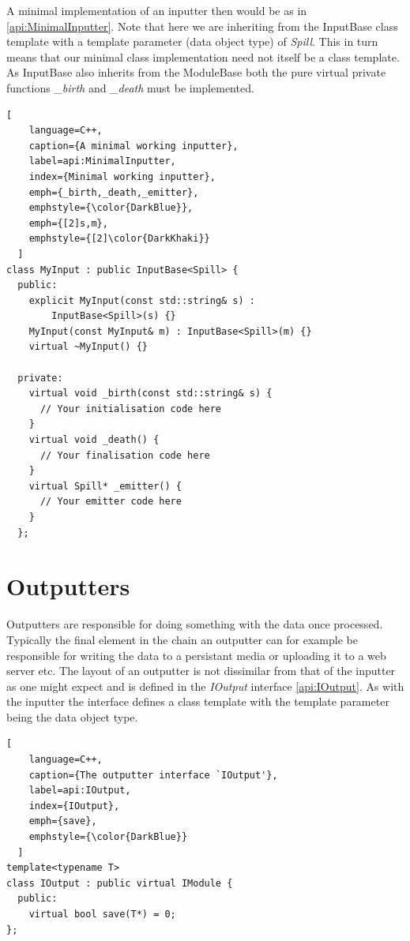 A minimal implementation of an inputter then would be as in \ref{api:MinimalInputter}. Note that here we are inheriting from the InputBase class template with a template parameter (data object type) of \emph{Spill}. This in turn means that our minimal class implementation need not itself be a class template. As InputBase also inherits from the ModuleBase both the pure virtual private functions \emph{\_birth} and \emph{\_death} must be implemented.
\begin{lstlisting}[
    language=C++,
    caption={A minimal working inputter},
    label=api:MinimalInputter,
    index={Minimal working inputter},
    emph={_birth,_death,_emitter},
    emphstyle={\color{DarkBlue}},
    emph={[2]s,m},
    emphstyle={[2]\color{DarkKhaki}}
  ]
class MyInput : public InputBase<Spill> {
  public:
    explicit MyInput(const std::string& s) : 
        InputBase<Spill>(s) {}
    MyInput(const MyInput& m) : InputBase<Spill>(m) {}
    virtual ~MyInput() {}

  private:
    virtual void _birth(const std::string& s) {
      // Your initialisation code here
    }
    virtual void _death() {
      // Your finalisation code here
    }
    virtual Spill* _emitter() {
      // Your emitter code here
    }
  };
\end{lstlisting}
\section{Outputters}

Outputters are responsible for doing something with the data once processed. Typically the final element in the chain an outputter can for example be responsible for writing the data to a persistant media or uploading it to a web server etc. The layout of an outputter is not dissimilar from that of the inputter as one might expect and is defined in the \emph{IOutput} interface \ref{api:IOutput}. As with the inputter the interface defines a class template with the template parameter being the data object type.
\begin{lstlisting}[
    language=C++,
    caption={The outputter interface `IOutput'},
    label=api:IOutput, 
    index={IOutput},
    emph={save},
    emphstyle={\color{DarkBlue}}
  ]
template<typename T>
class IOutput : public virtual IModule {
  public:
    virtual bool save(T*) = 0;
};
\end{lstlisting}

